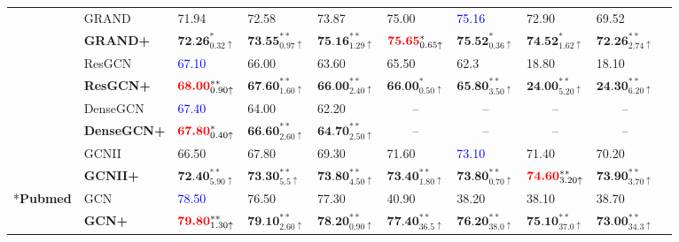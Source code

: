 \documentclass{article}
\begin{document}
\begin{table} [h!]
{\begin{tabular}{clllllllll}
     \cmidrule(r){2-9}
    & GRAND  & 71.94  & 72.58& 73.87 &75.00 &\textcolor{blue}{75.16} &72.90&69.52\\
     &\textbf{GRAND+}&$\textbf{72.26}_{0.32 \uparrow }^{*}$  & $\textbf{73.55}_{0.97 \uparrow }^{**}$& $\textbf{75.16}_{1.29 \uparrow }^{**}$ &$\textbf{\textcolor{red}{75.65}}_{0.65 \uparrow }^{*}$ & $\textbf{75.52}_{0.36 \uparrow }^{*}$&$\textbf{74.52}_{1.62 \uparrow }^{*}$&$\textbf{72.26}_{2.74 \uparrow }^{**}$\\
     \cmidrule(r){2-9}
    & ResGCN  & \textcolor{blue}{67.10}  &66.00& 63.60 &65.50 &62.3 &18.80&18.10\\
     &\textbf{ResGCN+}& $\textbf{\textcolor{red}{68.00}}_{0.90 \uparrow }^{**}$  & $\textbf{67.60}_{1.60 \uparrow }^{**}$& $\textbf{66.00}_{2.40 \uparrow }^{**}$ &$\textbf{66.00}_{0.50 \uparrow }^{*}$ & $\textbf{65.80}_{3.50 \uparrow }^{**}$&$\textbf{24.00}_{5.20 \uparrow }^{**}$&$\textbf{24.30}_{6.20 \uparrow }^{**}$\\
     \cmidrule(r){2-9}
    & DenseGCN  & \textcolor{blue}{67.40}  & 64.00& 62.20 &\multicolumn{1}{c}{--} &\multicolumn{1}{c}{--} &\multicolumn{1}{c}{--}&\multicolumn{1}{c}{--}\\
    &\textbf{DenseGCN+}& $\textbf{\textcolor{red}{67.80}}_{0.40 \uparrow }^{*}$  &$\textbf{66.60}_{2.60 \uparrow }^{**}$& $\textbf{64.70}_{2.50 \uparrow }^{**}$ &\multicolumn{1}{c}{--} & \multicolumn{1}{c}{--}&\multicolumn{1}{c}{--}&\multicolumn{1}{c}{--}\\
     \cmidrule(r){2-9}
    & GCNII  & 66.50  & 67.80& 69.30 & 71.60&\textcolor{blue}{73.10} &71.40 &70.20\\
    &\textbf{GCNII+}& $\textbf{72.40}_{5.90 \uparrow }^{**}$   & $\textbf{73.30}_{5.5 \uparrow }^{**}$ & $\textbf{73.80}_{4.50 \uparrow }^{**}$  &$\textbf{73.40}_{1.80 \uparrow }^{**}$  & $\textbf{73.80}_{0.70 \uparrow }^{**}$ &$\textbf{\textcolor{red}{74.60}}_{3.20 \uparrow }^{**}$ &$\textbf{73.90}_{3.70 \uparrow }^{**}$ \\
    \cmidrule(r){1-9}
       {\multirow{34}*{\textbf{Pubmed}} }  & GCN  & \textcolor{blue}{78.50}  & 76.50& 77.30 &40.90 & 38.20&38.10&38.70\\
    &\textbf{GCN+}& $\textbf{\textcolor{red}{79.80}}_{1.30 \uparrow }^{**}$  & $\textbf{79.10}_{2.60 \uparrow }^{**}$& $\textbf{78.20}_{0.90 \uparrow }^{**}$ &$\textbf{77.40}_{36.5 \uparrow }^{**}$ & $\textbf{76.20}_{38.0 \uparrow }^{**}$&$\textbf{75.10}_{37.0 \uparrow }^{**}$&$\textbf{73.00}_{34.3 \uparrow }^{**}$\\
     \cmidrule(r){2-9}

\end{tabular}}
\end{table}
\end{document}
